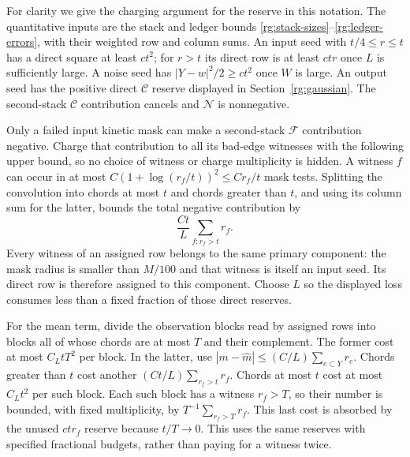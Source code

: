 For clarity we give the charging argument for the reserve in this
notation.  The quantitative inputs are the stack and ledger bounds
\eqref{rg:stack-sizes}--\eqref{rg:ledger-errors}, with their weighted
row and column sums.  An input seed with $t/4\le r\le t$ has a
direct square at least $ct^2$; for $r>t$ its direct row is at least
$ctr$ once $L$ is sufficiently large.  A noise seed has
$|Y-w|^2/2\ge ct^2$ once $W$ is large.  An output seed has the positive
direct $\mathcal C$ reserve displayed in Section~\ref{rg:gaussian}.
The second-stack $\mathcal C$ contribution cancels and $\mathcal N$
is nonnegative.

Only a failed input kinetic mask can make a second-stack
$\mathcal F$ contribution negative.  Charge that contribution to all
its bad-edge witnesses with the following upper bound, so no choice of
witness or charge multiplicity is hidden.  A witness $f$ can occur in
at most $C(1+\log(r_f/t))^2\le Cr_f/t$ mask tests.  Splitting the
convolution into chords at most $t$ and chords greater than $t$, and
using its column sum for the latter, bounds the total negative
contribution by
\[
 \frac{Ct}{L}\sum_{f:r_f>t}r_f.
\]
Every witness of an assigned row belongs to the same primary component:
the mask radius is smaller than $M/100$ and that witness is itself an
input seed.  Its direct row is therefore assigned to this component.
Choose $L$ so the displayed loss consumes less than a fixed fraction
of those direct reserves.

For the mean term, divide the observation blocks read by assigned rows
into blocks all of whose chords are at most $T$ and their complement.
The former cost at most $C_LtT^2$ per block.  In the latter, use
$|m-\widehat m|\le (C/L)\sum_{e\subset Y}r_e$.  Chords greater
than $t$ cost another $(Ct/L)\sum_{r_f>t}r_f$.  Chords at most $t$
cost at most $C_Lt^2$ per such block.  Each such block has a witness
$r_f>T$, so their number is bounded, with fixed multiplicity, by
$T^{-1}\sum_{r_f>T}r_f$.  This last cost is absorbed by the unused
$ctr_f$ reserve because $t/T\to0$.  This uses the same reserves with
specified fractional budgets, rather than paying for a witness twice.

